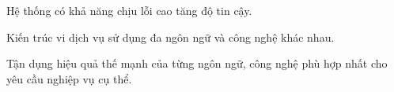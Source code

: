 Hệ thống có khả năng chịu lỗi cao tăng độ tin cậy.













Kiến trúc vi dịch vụ sử dụng đa ngôn ngữ và công nghệ khác nhau.

Tận dụng hiệu quả thế mạnh của từng ngôn ngữ, công nghệ phù hợp nhất cho yêu cầu nghiệp vụ cụ thể.








